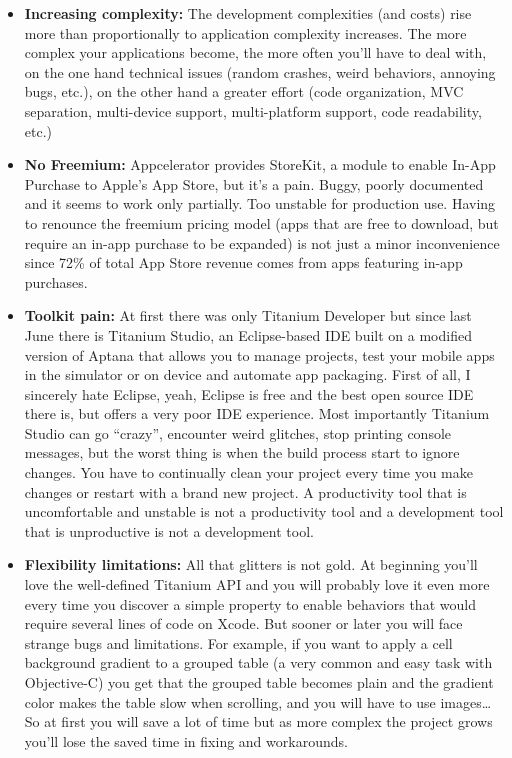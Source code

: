 \begin{itemize}


 \item \textbf{Increasing complexity:}  The development complexities (and costs) rise more than proportionally to application complexity increases. The more complex your applications become, the more often you’ll have to deal with, on the one hand technical issues (random crashes, weird behaviors, annoying bugs, etc.), on the other hand a greater effort (code organization, MVC separation, multi-device support, multi-platform support, code readability, etc.)

 \item \textbf{No Freemium:}  Appcelerator provides StoreKit, a module to enable In-App Purchase to Apple’s App Store, but it’s a pain.
 Buggy, poorly documented and it seems to work only partially. Too unstable for production use. Having to renounce the freemium pricing model (apps that are free to download,
 but require an in-app purchase to be expanded) is not just a minor inconvenience since 72\% of total App Store revenue comes from apps featuring in-app purchases.

 \item \textbf{Toolkit pain:}   At first there was only Titanium Developer but since last June there is Titanium Studio, an Eclipse-based IDE built on a modified version of Aptana that allows you to manage projects, test your mobile apps in the simulator or on device and automate app packaging. First of all,
 I sincerely hate Eclipse, yeah, Eclipse is free and the best open source IDE there is, but offers a very poor IDE experience.
 Most importantly Titanium Studio can go “crazy”, encounter weird glitches, stop printing console messages,
  but the worst thing is when the build process start to ignore changes. You have to continually clean your project every time you make changes or restart with a brand new project. A productivity tool that is uncomfortable and unstable is not a productivity tool and a development tool that is unproductive is not a development tool.

 \item \textbf{Flexibility limitations: }  All that glitters is not gold. At beginning you’ll love the well-defined Titanium API and you will probably love it even more every time you discover a simple property to enable behaviors that would require several lines of code on Xcode. But sooner or later you will face strange bugs and limitations. For example, if you want to apply a cell background gradient to a grouped table (a very common and easy task with Objective-C) you get that the grouped table becomes plain and the gradient color makes the table slow when scrolling, and you will have to use images… So at first you will save a lot of time but as more complex the project grows you’ll lose the saved time in fixing and workarounds.


\end{itemize}
